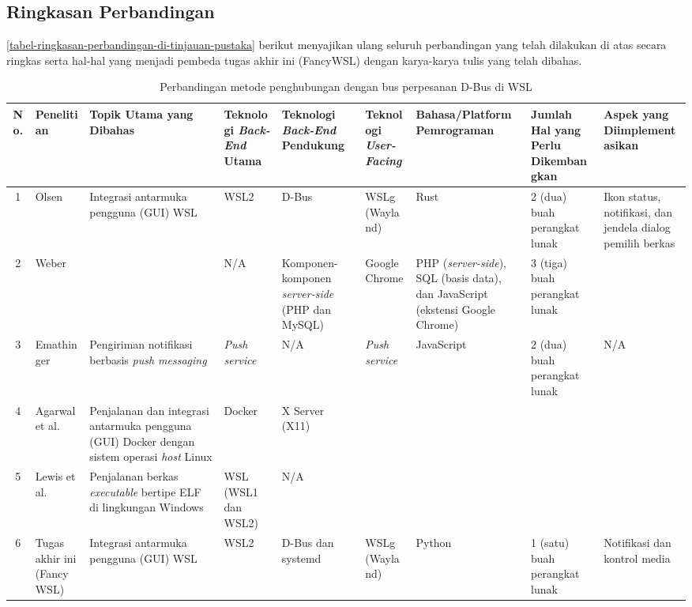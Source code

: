 \subsection{Ringkasan Perbandingan}

\autoref{tabel-ringkasan-perbandingan-di-tinjauan-pustaka} berikut menyajikan ulang seluruh perbandingan yang telah dilakukan di atas secara ringkas serta hal-hal yang menjadi pembeda tugas akhir ini (FancyWSL) dengan karya-karya tulis yang telah dibahas.

\begin{landscape}
\begin{table}
    \centering
    \caption{Perbandingan metode penghubungan dengan bus perpesanan D-Bus di WSL}
    \label{tabel-ringkasan-perbandingan-di-tinjauan-pustaka}
    \begin{tabularx}{\linewidth}{|c|p{3.5cm}|p{3.5cm}|X|X|X|X|X|X|} \hline
        \textbf{No.} & \textbf{Penelitian} & \textbf{Topik Utama yang Dibahas} & \textbf{Teknologi \textit{Back-End} Utama} & \textbf{Teknologi \textit{Back-End} Pendukung} & \textbf{Teknologi \textit{User-Facing}} & \textbf{Bahasa/Platform Pemrograman} & \textbf{Jumlah Hal yang Perlu Dikembangkan} & \textbf{Aspek yang Diimplementasikan}\\ \hline
        1 & Olsen \cite{olsen-2022-through-the-wormhole} & Integrasi antarmuka pengguna (GUI) WSL & WSL2 & D-Bus & WSLg (Wayland) & Rust & 2 (dua) buah perangkat lunak & Ikon status, notifikasi, dan jendela dialog pemilih berkas \\ \hline
        
        2 & Weber & & N/A & Komponen-komponen \textit{server-side} (PHP dan MySQL) & Google Chrome\cite{weber2015notifications} & PHP (\textit{server-side}), SQL (basis data), dan JavaScript (ekstensi Google Chrome) & 3 (tiga) buah perangkat lunak\\ \hline
        
        3 & Emathinger \cite{emathinger2015unified} & Pengiriman notifikasi berbasis \textit{push messaging} & \textit{Push service} & N/A & \textit{Push service} & JavaScript & 2 (dua) buah perangkat lunak & N/A\\ \hline
        
        4 & Agarwal et al. & Penjalanan dan integrasi antarmuka pengguna (GUI) Docker dengan sistem operasi \textit{host} Linux & Docker &  X Server (X11)\cite{agarwal2021gui}\\ \hline
        
        5 & Lewis et al. & Penjalanan berkas \textit{executable} bertipe ELF di lingkungan Windows & WSL (WSL1 dan WSL2) & N/A & \cite{lewis2018memory}\\ \hline
        
        6 & Tugas akhir ini (FancyWSL) & Integrasi antarmuka pengguna (GUI) WSL & WSL2 & D-Bus dan systemd & WSLg (Wayland) & Python & 1 (satu) buah perangkat lunak & Notifikasi dan kontrol media\\ \hline
    \end{tabularx}
\end{table}
\end{landscape}

